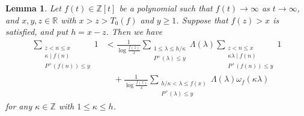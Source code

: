 \documentclass[a4paper,11pt]{amsart}
\newtheorem{lemma}[theorem]{Lemma}
\theoremstyle{definition}
\numberwithin{equation}{section}
\begin{document}
\begin{lemma}\label{lem:3.1}
Let $f(t) \in \mathbb{Z}[t]$ be a polynomial such that $f(t) \to\infty$ as $t \to\infty$, and $x,y,z \in \mathbb{R}$ with $x>z>T_0(f)$ and $y \geq1$. 
Suppose that $f(z)>x$ is satisfied, and put $h=x-z$. 
Then we have 
\begin{align}\label{eq:09291603}
\sum_{\substack{z<n \leq x \\ \kappa \mid f(n) \\ P^+(f(n)) \leq y}} 1
&< \frac{1}{\log{\frac{f(z)}{x}}} \sum_{\substack{1 \leq \lambda \leq h/\kappa \\ P^+(\lambda) \leq y}} \Lambda(\lambda)
\sum_{\substack{z<n \leq x \\ \kappa \lambda \mid f(n) \\ P^+(f(n)) \leq y}}  1 \\
&\quad
+ \frac{1}{\log{\frac{f(z)}{x}}} \sum_{\substack{h/\kappa < \lambda \leq f(x) \\ P^+(\lambda) \leq y}} \Lambda(\lambda)
\omega_f(\kappa \lambda) \nonumber
\end{align}
for any $\kappa \in \mathbb{Z}$ with $1 \leq \kappa \leq h$. 
\end{lemma}
\end{document}
